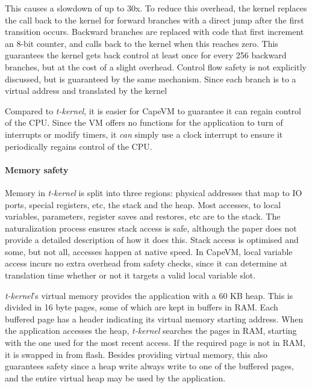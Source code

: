 This causes a slowdown of up to 30x. To reduce this overhead, the kernel replaces the call back to the kernel for forward branches with a direct jump after the first transition occurs. Backward branches are replaced with code that first increment an 8-bit counter, and calls back to the kernel when this reaches zero. This guarantees the kernel gets back control at least once for every 256 backward branches, but at the cost of a slight overhead. Control flow safety is not explicitly discussed, but is guaranteed by the same mechanism. Since each branch is to a virtual address and translated by the kernel

Compared to \emph{t-kernel}, it is easier for CapeVM to guarantee it can regain control of the CPU. Since the VM offers no functions for the application to turn of interrupts or modify timers, it \emph{can} simply use a clock interrupt to ensure it periodically regains control of the CPU.


\paragraph{Memory safety}
Memory in \emph{t-kernel} is split into three regions: physical addresses that map to IO ports, special registers, etc, the stack and the heap. Most accesses, to local variables, parameters, register saves and restores, etc are to the stack. The naturalization process ensures stack access is safe, although the paper does not provide a detailed description of how it does this. Stack access is optimised and some, but not all, accesses happen at native speed. In CapeVM, local variable access incurs no extra overhead from safety checks, since it can determine at translation time whether or not it targets a valid local variable slot.

\emph{t-kernel}'s virtual memory provides the application with a 60 KB heap. This is divided in 16 byte pages, some of which are kept in buffers in RAM. Each buffered page has a header indicating its virtual memory starting address. When the application accesses the heap, \emph{t-kernel} searches the pages in RAM, starting with the one used for the most recent access. If the required page is not in RAM, it is swapped in from flash. Besides providing virtual memory, this also guarantees safety since a heap write always write to one of the buffered pages, and the entire virtual heap may be used by the application.

